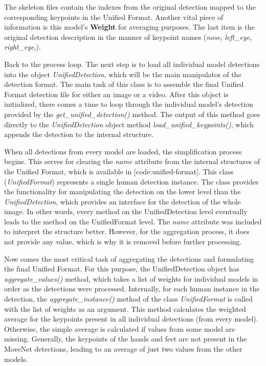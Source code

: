 The skeleton files contain the indexes from the original detection mapped to the corresponding keypoints in the Unified Format. Another vital piece of information is this model's {\bf Weight} for averaging purposes. The last item is the original detection description in the manner of keypoint names ({\it nose}, {\it left_eye}, {\it right_eye},\edots).


Back to the process loop. The next step is to load all individual model detections into the object {\it UnifiedDetection}, which will be the main manipulator of the detection format. The main task of this class is to assemble the final Unified Format detection file for either an image or a video. After this object is initialized, there comes a time to loop through the individual model's detection provided by the {\it get_unified_detection()} method. The output of this method goes directly to the {\it UnifiedDetection} object method {\it load_unified_keypoints()}, which appends the detection to the internal structure.

When all detections from every model are loaded, the simplification process begins. This serves for clearing the {\it name} attribute from the internal structures of the Unified Format, which is available in [code:unified-format]. This class ({\it UnifiedFormat}) represents a single human detection instance. The class provides the functionality for manipulating the detection on the lower level than the {\it UnifiedDetection}, which provides an interface for the detection of the whole image. In other words, every method on the UnifiedDetection level eventually leads to the method on the UnifiedFormat level. The {\it name} attribute was included to interpret the structure better. However, for the aggregation process, it does not provide any value, which is why it is removed before further processing.


Now comes the most critical task of aggregating the detections and formulating the final Unified Format. For this purpose, the UnifiedDetection object has {\it aggregate_values()} method, which takes a list of weights for individual models in order as the detections were processed. Internally, for each human instance in the detection, the {\it aggregate_instance()} method of the class {\it UnifiedFormat} is called with the list of weights as an argument. This method calculates the weighted average for the keypoints present in all individual detections (from every model). Otherwise, the simple average is calculated if values from some model are missing. Generally, the keypoints of the hands and feet are not present in the MoveNet detections, leading to an average of just two values from the other models.

